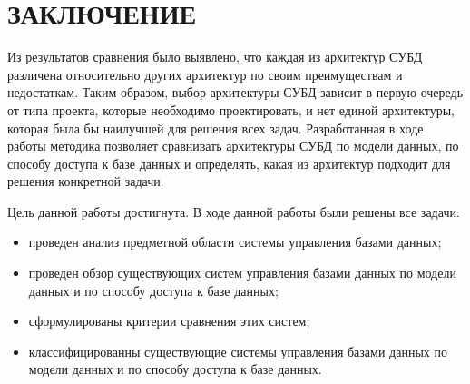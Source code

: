 \section*{\centering ЗАКЛЮЧЕНИЕ}

Из результатов сравнения было выявлено, что каждая из архитектур СУБД различена относительно других архитектур по своим преимуществам и недостаткам. Таким образом, выбор архитектуры СУБД зависит в первую очередь от типа проекта, которые необходимо проектировать, и нет единой архитектуры, которая была бы наилучшей для решения всех задач. Разработанная в ходе работы методика позволяет сравнивать архитектуры СУБД по модели данных, по способу доступа к базе данных и определять, какая из архитектур подходит для решения конкретной задачи.

Цель данной работы достигнута. В ходе данной работы были решены все задачи:
\begin{itemize}
	\item проведен анализ предметной области системы управления базами данных;
	\item проведен обзор существующих систем управления базами данных по модели данных и по способу доступа к базе данных;
	\item сформулированы критерии сравнения этих систем;
	\item классифицированны существующие системы управления базами данных по модели данных и по способу доступа к базе данных.
\end{itemize}


